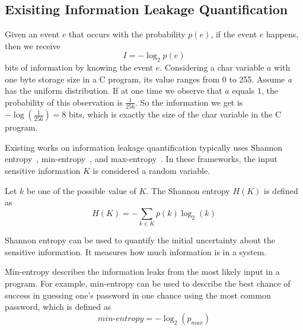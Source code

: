 
\subsection{Exisiting Information Leakage Quantification}\label{sec:background_leak}

Given an event $e$ that occurs with the probability $p(e)$, if the event $e$
happens, then we receive
\begin{displaymath}
    I = - \log_2p(e)
\end{displaymath}
bits of information by knowing the event $e$. Considering a char variable $a$
with one byte storage size in a C program, its value ranges from 0 to 255.
Assume \textit{a} has the uniform distribution. If at one time we observe that
$a$ equals $1$, the probability of this observation is $\frac{1}{256}$. So the
information we get is $-\log(\frac{1}{256}) = 8$ bits, which is exactly the size
of the char variable in the C program.

Existing works on information leakage quantification typically uses Shannon
entropy~\cite{Wichelmann:2018:MFF:3274694.3274741},
min-entropy~\cite{10.1007/978-3-642-00596-1_21}, and max-entropy~\cite{182946,
Doychev:2017:RAS:3062341.3062388}. In these frameworks, the input sensitive
information $K$ is considered a random variable.

Let $k$ be one of the possible
value of $K$. The Shannon entropy $H(K)$ is defined as
\begin{displaymath}
    H(K) = - \sum_{k {\in} K}p(k)\log_2(k)
\end{displaymath}

Shannon entropy can be used to quantify the initial uncertainty about the
sensitive information. It measures how much information is in a system.

Min-entropy describes the information leaks from
the most likely input in a program. For example, min-entropy can be used to describe the
best chance of success in guessing one's password in one chance using the
most common password, which is defined as
\begin{displaymath}
    \mathit{min\text{-}entropy} = - \log_2(p_{\mathit{max}})
\end{displaymath}

